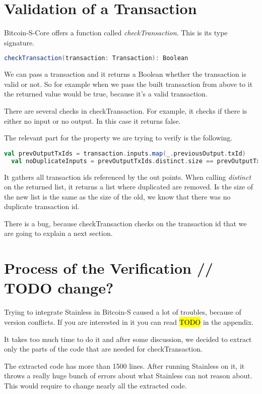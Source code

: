 \section{Validation of a Transaction}

Bitcoin-S-Core offers a function called \emph{checkTransaction}.
This is its type signature.
\begin{lstlisting}[language=scala]
  checkTransaction(transaction: Transaction): Boolean
\end{lstlisting}
We can pass a transaction and it returns a Boolean whether the transaction is valid or not.
So for example when we pass the built transaction from above to it the returned value would be true, because it's a valid transaction.

There are several checks in checkTransaction.
For example, it checks if there is either no input or no output.
In this case it returns false.

The relevant part for the property we are trying to verify is the following.
\begin{lstlisting}[language=scala]
  val prevOutputTxIds = transaction.inputs.map(_.previousOutput.txId)
  val noDuplicateInputs = prevOutputTxIds.distinct.size == prevOutputTxIds.size
\end{lstlisting}

It gathers all transaction ids referenced by the out points.
When calling \emph{distinct} on the returned list, it returns a list where duplicated are removed.
Is the size of the new list is the same as the size of the old, we know that there was no duplicate transaction id.

There is a bug, because checkTransaction checks on the transaction id that we are going to explain a next section.


\section{Process of the Verification // TODO change?}

Trying to integrate Stainless in Bitcoin-S caused a lot of troubles, because of version conflicts.
If you are interested in it you can read \hl{TODO} in the appendix.

It takes too much time to do it and after some discussion, we decided to extract only the parts of the code that are needed for checkTransaction.

The extracted code has more than 1500 lines.
After running Stainless on it, it throws a really huge bunch of errors about what Stainless can not reason about.
This would require to change nearly all the extracted code.


